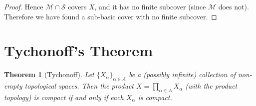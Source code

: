 \documentclass[11pt,a4paper,twoside]{book}
\newtheorem{theorem}{Theorem}[section]
\theoremstyle{remark}
\theoremstyle{definition}
\theoremstyle{definition}
\begin{document}
\begin{proof}
Hence $\mathcal{M} \cap \mathcal{S}$ covers $X$, and it has no finite subcover
(since $\mathcal{M}$ does not).  Therefore we have found a sub-basic cover with
no finite subcover.
\end{proof}

\section{Tychonoff's Theorem}
\label{sec:tychonoff}

\begin{theorem}[Tychonoff]\label{thm:tychonoff}
Let $\{X_\alpha\}_{\alpha \in A}$ be a (possibly infinite) collection of
non-empty topological spaces.  Then the product
$X = \prod_{\alpha \in A} X_\alpha$ (with the product topology) is compact if
and only if each $X_\alpha$ is compact.
\end{theorem}
\end{document}
